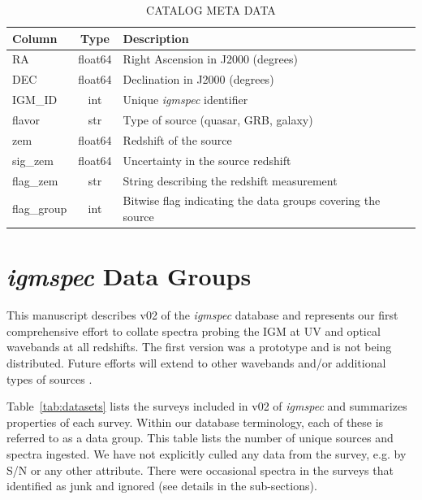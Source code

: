 \documentclass[12pt]{elsarticle}
\begin{document}
 
\begin{table}
\caption{CATALOG META DATA\label{tab:cat_keys}}
\footnotesize
\begin{tabular}{lcl}
Column & Type  & Description \\
\hline
RA           & float64 & Right Ascension in J2000 (degrees) \\
DEC          & float64 & Declination in J2000 (degrees) \\
IGM\_ID      & int     & Unique {\it igmspec} identifier \\
flavor       & str     & Type of source (quasar, GRB, galaxy) \\
zem          & float64 & Redshift of the source \\
sig\_zem     & float64 & Uncertainty in the source redshift \\
flag\_zem    & str     & String describing the redshift measurement \\
flag\_group  & int     & Bitwise flag indicating the data groups covering the source \\
\hline
\end{tabular}
\end{table}



\section{{\it igmspec} Data Groups}
\label{sec:datasets}

This manuscript describes v02 of the {\it igmspec}
database and represents our first comprehensive effort to collate
spectra probing the IGM at UV and optical wavebands at all
redshifts.  
The first version was a prototype and is not being
distributed.
Future efforts will extend to other wavebands and/or
additional types of sources 
\citep[e.g. star-forming galaxies;][]{rpk+10}.

Table~\ref{tab:datasets} lists the surveys included in
v02 of {\it igmspec} and summarizes properties
of each survey.  
Within our database terminology, each of these
is referred to as a data group.
This table lists the number of unique sources and spectra
ingested.  We have not explicitly culled any data
from the survey, e.g. by S/N or any other attribute.
There were occasional spectra in the surveys
that identified as junk and ignored (see details in the
sub-sections). 
\end{document}

